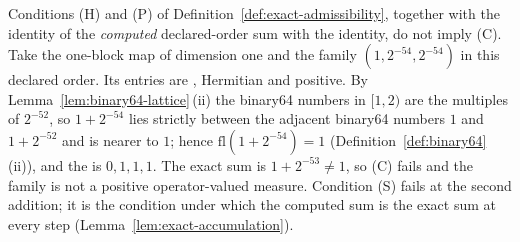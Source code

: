 
\begin{remark}\label{rem:computed-completeness}
Conditions (H) and (P) of Definition~\ref{def:exact-admissibility}, together
with the identity of the \emph{computed} declared-order sum with the identity,
do not imply (C). Take the one-block map of dimension one and the family
$(1,2^{-54},2^{-54})$ in this declared order. Its entries are
,
Hermitian and positive. By Lemma~\ref{lem:binary64-lattice}\,(ii) the binary64
numbers in $[1,2)$ are the multiples of $2^{-52}$, so $1+2^{-54}$ lies strictly
between the adjacent binary64 numbers $1$ and $1+2^{-52}$ and is nearer to $1$;
hence $\mathrm{fl}(1+2^{-54})=1$ (Definition~\ref{def:binary64}\,(ii)), and
the  is
$0,1,1,1$. The exact sum is $1+2^{-53}\neq1$, so (C) fails and the family is
not a positive operator-valued measure. Condition (S) fails at the second
addition; it is the condition under which the computed sum is the exact sum at
every step (Lemma~\ref{lem:exact-accumulation}).
\end{remark}
